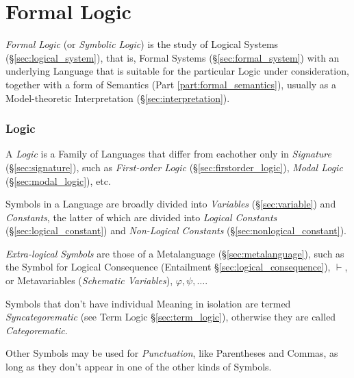 \part{Formal Logic}\label{part:formal_logic}

\emph{Formal Logic} (or \emph{Symbolic Logic}) is the study of Logical
Systems (\S\ref{sec:logical_system}), that is, Formal Systems
(\S\ref{sec:formal_system}) with an underlying Language that is
suitable for the particular Logic under consideration, together with a
form of Semantics (Part \ref{part:formal_semantics}), usually as a
Model-theoretic Interpretation (\S\ref{sec:interpretation}).



\section{Logic}\label{sec:logic}

A \emph{Logic} is a Family of Languages that differ from eachother
only in \emph{Signature} (\S\ref{sec:signature}), such as
\emph{First-order Logic} (\S\ref{sec:firstorder_logic}), \emph{Modal
  Logic} (\S\ref{sec:modal_logic}), etc.

Symbols in a Language are broadly divided into \emph{Variables}
(\S\ref{sec:variable}) and \emph{Constants}, the latter of which are
divided into \emph{Logical Constants} (\S\ref{sec:logical_constant})
and \emph{Non-Logical Constants} (\S\ref{sec:nonlogical_constant}).

\emph{Extra-logical Symbols} are those of a Metalanguage
(\S\ref{sec:metalanguage}), such as the Symbol for Logical Consequence
(Entailment \S\ref{sec:logical_consequence}), $\vdash$, or
Metavariables (\emph{Schematic Variables}), $\varphi, \psi, \ldots$.

Symbols that don't have individual Meaning in isolation are termed
\emph{Syncategorematic} (see Term Logic \S\ref{sec:term_logic}),
otherwise they are called \emph{Categorematic}.

Other Symbols may be used for \emph{Punctuation}, like Parentheses and
Commas, as long as they don't appear in one of the other kinds of
Symbols.

